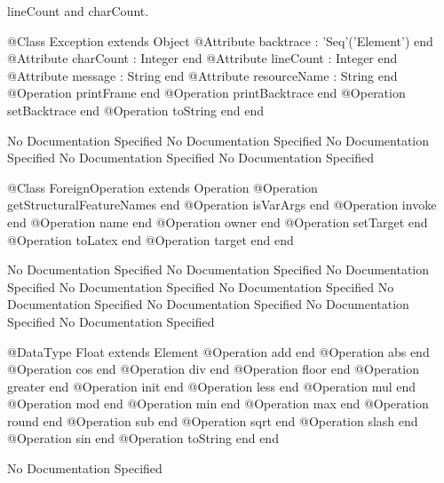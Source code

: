       lineCount and charCount.
\begin{Interface}
@Class Exception extends Object
  @Attribute backtrace : 'Seq'('Element') end
  @Attribute charCount : Integer end
  @Attribute lineCount : Integer end
  @Attribute message : String end
  @Attribute resourceName : String end
  @Operation printFrame end
  @Operation printBacktrace end
  @Operation setBacktrace end
  @Operation toString end
end
\end{Interface}
No Documentation Specified
No Documentation Specified
No Documentation Specified
No Documentation Specified
No Documentation Specified
\begin{Interface}
@Class ForeignOperation extends Operation
  @Operation getStructuralFeatureNames end
  @Operation isVarArgs end
  @Operation invoke end
  @Operation name end
  @Operation owner end
  @Operation setTarget end
  @Operation toLatex end
  @Operation target end
end
\end{Interface}
No Documentation Specified
No Documentation Specified
No Documentation Specified
No Documentation Specified
No Documentation Specified
No Documentation Specified
No Documentation Specified
No Documentation Specified
No Documentation Specified
\begin{Interface}
@DataType Float extends Element
  @Operation add end
  @Operation abs end
  @Operation cos end
  @Operation div end
  @Operation floor end
  @Operation greater end
  @Operation init end
  @Operation less end
  @Operation mul end
  @Operation mod end
  @Operation min end
  @Operation max end
  @Operation round end
  @Operation sub end
  @Operation sqrt end
  @Operation slash end
  @Operation sin end
  @Operation toString end
end
\end{Interface}
No Documentation Specified
